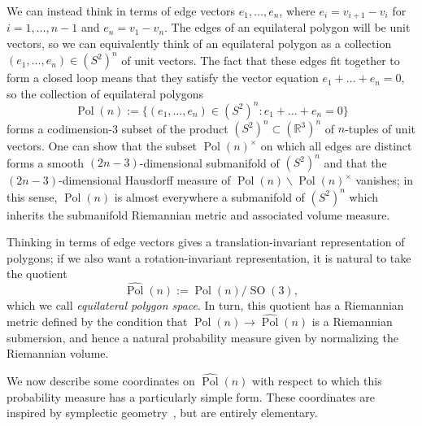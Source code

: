 \documentclass{article}
\theoremstyle{definition}
\newcommand{\R}{\mathbb{R}}
\newcommand{\Pol}{\operatorname{Pol}}
\newcommand{\Polhat}{\widehat{\operatorname{Pol}}}
\newcommand{\SO}{\operatorname{SO}}
\begin{document}
We can instead think in terms of edge vectors $e_1, \dots , e_n$, where $e_i = v_{i+1} - v_i$ for $i=1, \dots , n-1$ and $e_n = v_1 - v_n$. The edges of an equilateral polygon will be unit vectors, so we can equivalently think of an equilateral polygon as a collection $(e_1, \dots , e_n) \in (S^2)^n$ of unit vectors. The fact that these edges fit together to form a closed loop means that they satisfy the vector equation $e_1 + \dots + e_n = 0$, so the collection of equilateral polygons
\[
	\Pol(n) := \{(e_1, \dots , e_n) \in (S^2)^n: e_1 + \dots + e_n = 0\}
\]
forms a codimension-3 subset of the product $(S^2)^n \subset (\R^3)^n$ of $n$-tuples of unit vectors. One can show that the subset $\Pol(n)^\times$ on which all edges are distinct forms a smooth $(2n-3)$-dimensional submanifold of $(S^2)^n$ and that the $(2n-3)$-dimensional Hausdorff measure of $\Pol(n) \backslash \Pol(n)^\times$ vanishes; in this sense, $\Pol(n)$ is almost everywhere a submanifold of $(S^2)^n$ which inherits the submanifold Riemannian metric and associated volume measure.

Thinking in terms of edge vectors gives a translation-invariant representation of polygons; if we also want a rotation-invariant representation, it is natural to take the quotient
	\[
		\Polhat(n) := \Pol(n)/\SO(3),
	\]
which we call \emph{equilateral polygon space}. In turn, this quotient has a Riemannian metric defined by the condition that $\Pol(n) \to \Polhat(n)$ is a Riemannian submersion, and hence a natural probability measure given by normalizing the Riemannian volume.

We now describe some coordinates on $\Polhat(n)$ with respect to which this probability measure has a particularly simple form. These coordinates are inspired by symplectic geometry~\cite{kapovichSymplecticGeometryPolygons1996}, but are entirely elementary.
\end{document}
